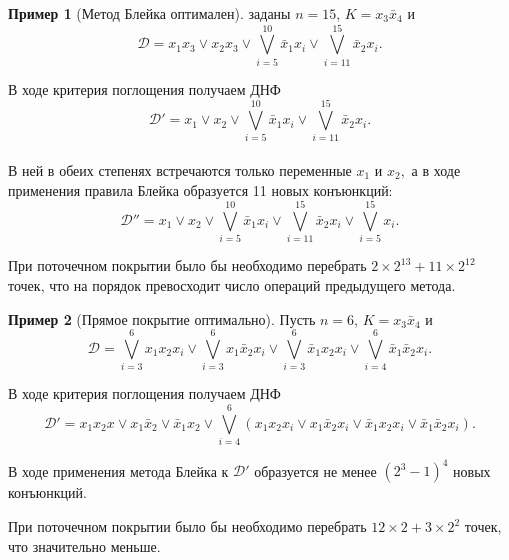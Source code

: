 \documentclass[12pt,a4paper,oneside,fleqn,leqno]{article}
\theoremstyle{definition}
\newtheorem{example}{Пример}%
\begin{document}
		\begin{example}[Метод Блейка оптимален]
			\hspace{5pt} заданы $n = 15$, $K = x_3\bar{x}_4$ и 
			$$\mathcal{D} = x_1x_3 \vee x_2x_3 \vee \bigvee\limits_{i = 5}^{10}\bar{x}_1x_i \vee \bigvee\limits_{i = 11}^{15}\bar{x}_2x_i.$$\par
			В ходе критерия поглощения получаем ДНФ
			$$\mathcal{D}' = x_1 \vee x_2 \vee \bigvee\limits_{i = 5}^{10}\bar{x}_1x_i \vee \bigvee\limits_{i = 11}^{15}\bar{x}_2x_i.$$\\
			В ней в обеих степенях встречаются только переменные $x_1$ и $x_2,$ а в ходе применения правила Блейка образуется 11 новых конъюнкций:
			$$
				\mathcal{D}'' = x_1 \vee x_2 \vee \bigvee\limits_{i = 5}^{10}\bar{x}_1x_i \vee \bigvee\limits_{i = 11}^{15}\bar{x}_2x_i \vee \bigvee\limits_{i = 5}^{15}x_i.
			$$\par
			При поточечном покрытии было бы необходимо перебрать $2\times 2^{13} + {11}\times 2^{12}$ точек, что на порядок превосходит число операций предыдущего метода.
		\end{example}
		\begin{example}[Прямое покрытие оптимально]
			\hspace{5pt}\par Пусть $n = 6$, $K = x_3\bar{x}_4$ и 
			$$
				\mathcal{D} = \bigvee\limits_{i = 3}^6x_1x_2x_i \vee \bigvee\limits_{i = 3}^6x_1\bar{x}_2x_i \vee \bigvee\limits_{i = 3}^6\bar{x}_1x_2x_i \vee \bigvee\limits_{i = 4}^6\bar{x}_1\bar{x}_2x_i.
			$$\par
			В ходе критерия поглощения получаем ДНФ
			$$
				\mathcal{D}' = x_1x_2x \vee x_1\bar{x}_2 \vee \bar{x}_1x_2 \vee \bigvee\limits_{i = 4}^6(x_1x_2x_i \vee x_1\bar{x}_2x_i \vee \bar{x}_1x_2x_i \vee \bar{x}_1\bar{x}_2x_i).
			$$\par
			В ходе применения метода Блейка к $\mathcal{D}'$ образуется не менее $(2^3-1)^4$ новых конъюнкций.\par
			При поточечном покрытии было бы необходимо перебрать $12 \times 2 + 3 \times 2^2$ точек, что значительно меньше.
		\end{example}
\newpage

\end{document}
